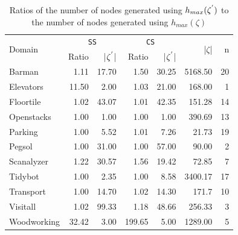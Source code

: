 \begin{table}[]
\centering
\caption{Ratios of the number of nodes generated using $h_{max}(\zeta\sp{'})$ to the number of nodes generated using $h_{max}(\zeta)$}
\begin{tabular}{lrrrrrr}
\hline
\multirow{2}{*}{Domain} & \multicolumn{2}{c}{\texttt{SS}} & \multicolumn{2}{c}{\texttt{CS}}   & \multirow{2}{*}{|$\zeta$|} & \multirow{2}{*}{n} \\ \cline{2-5}
                        & Ratio    & |$\zeta\sp{'}$|   & Ratio  & |$\zeta\sp{'}$| &                            &                    \\ \hline
Barman                  & 1.11     & 17.70       & 1.50   & 30.25           & 5168.50                    & 20                 \\
Elevators               & 11.50     & 2.00       & 1.03   & 21.00           & 168.00                     & 1                  \\
Floortile               & 1.02     & 43.07       & 1.01   & 42.35           & 151.28                     & 14                 \\
Openstacks              & 1.00     & 1.00        & 1.00   & 1.00            & 390.69                     & 13                 \\
Parking                 & 1.00     & 5.52        & 1.01   & 7.26            & 21.73                      & 19                 \\
Pegsol                  & 1.00     & 31.00       & 1.00   & 57.00           & 90.00                      & 2                  \\
Scanalyzer              & 1.22     & 30.57       & 1.56   & 19.42           & 72.85                      & 7                  \\
Tidybot                 & 1.00     & 2.35        & 1.00   & 8.58            & 3400.17                    & 17                 \\
Transport               & 1.00     & 14.70        & 1.02   & 14.30           & 171.7                     & 10                  \\
Visitall                & 1.02     & 99.33       & 1.18   & 48.66           & 256.33                     & 3                  \\
Woodworking             & 32.42     & 3.00       & 199.65 & 5.00           & 1289.00                     & 5                  \\ \hline
\end{tabular}
\label{tb_one}
\end{table}

